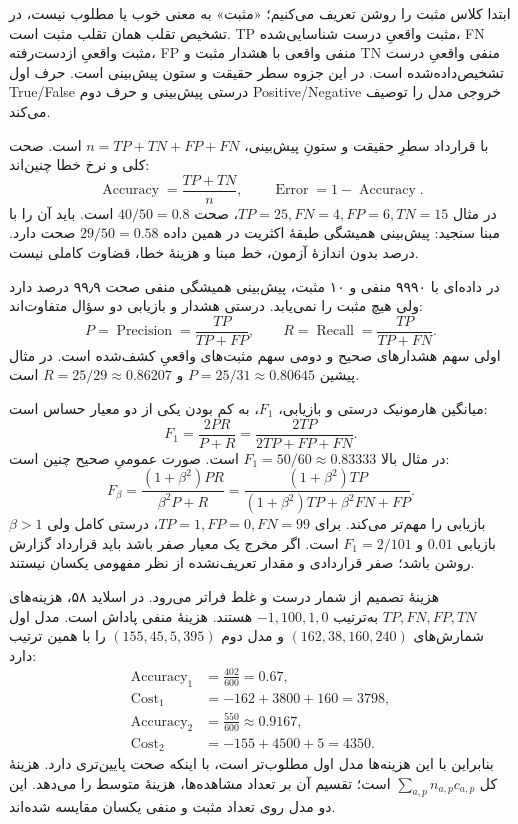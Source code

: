 \documentclass[12pt,a4paper,oneside]{report}
\begin{document}
ابتدا کلاس مثبت را روشن تعریف می‌کنیم؛ «مثبت» به معنی خوب یا مطلوب نیست، در تشخیص تقلب همان تقلب مثبت است. TP مثبت واقعیِ درست شناسایی‌شده، FN مثبت واقعیِ ازدست‌رفته، FP منفی واقعی با هشدار مثبت و TN منفی واقعیِ درست تشخیص‌داده‌شده است. در این جزوه سطر حقیقت و ستون پیش‌بینی است. حرف اول True/False درستی پیش‌بینی و حرف دوم Positive/Negative خروجی مدل را توصیف می‌کند.

با قرارداد سطرِ حقیقت و ستونِ پیش‌بینی، $n=TP+TN+FP+FN$ است. صحت کلی و نرخ خطا چنین‌اند:
\[\operatorname{Accuracy}=\frac{TP+TN}{n},\qquad \operatorname{Error}=1-\operatorname{Accuracy}.\]
در مثال $TP=25,FN=4,FP=6,TN=15$، صحت $40/50=0.8$ است. باید آن را با مبنا سنجید: پیش‌بینی همیشگی طبقهٔ اکثریت در همین داده $29/50=0.58$ صحت دارد. درصد بدون اندازهٔ آزمون، خط مبنا و هزینهٔ خطا، قضاوت کاملی نیست.

در داده‌ای با ۹۹۹۰ منفی و ۱۰ مثبت، پیش‌بینی همیشگی منفی صحت ۹۹٫۹ درصد دارد ولی هیچ مثبت را نمی‌یابد. درستی هشدار و بازیابی دو سؤال متفاوت‌اند:
\[P=\operatorname{Precision}=\frac{TP}{TP+FP},\qquad R=\operatorname{Recall}=\frac{TP}{TP+FN}.\]
اولی سهم هشدارهای صحیح و دومی سهم مثبت‌های واقعیِ کشف‌شده است. در مثال پیشین $P=25/31\approx0.80645$ و $R=25/29\approx0.86207$ است.

میانگین هارمونیک درستی و بازیابی، $F_1$، به کم بودن یکی از دو معیار حساس است:
\[F_1=\frac{2PR}{P+R}=\frac{2TP}{2TP+FP+FN}.\]
در مثال بالا $F_1=50/60\approx0.83333$ است. صورت عمومیِ صحیح چنین است:
\[F_\beta=\frac{(1+\beta^2)PR}{\beta^2P+R}=\frac{(1+\beta^2)TP}{(1+\beta^2)TP+\beta^2FN+FP}.\]
$\beta>1$ بازیابی را مهم‌تر می‌کند. برای $TP=1,FP=0,FN=99$، درستی کامل ولی بازیابی $0.01$ و $F_1=2/101$ است. اگر مخرج یک معیار صفر باشد باید قرارداد گزارش روشن باشد؛ صفر قراردادی و مقدار تعریف‌نشده از نظر مفهومی یکسان نیستند.

هزینهٔ تصمیم از شمار درست و غلط فراتر می‌رود. در اسلاید ۵۸، هزینه‌های $TP,FN,FP,TN$ به‌ترتیب $-1,100,1,0$ هستند. هزینهٔ منفی پاداش است. مدل اول شمارش‌های $(162,38,160,240)$ و مدل دوم $(155,45,5,395)$ را با همین ترتیب دارد:
\begin{align*}
\operatorname{Accuracy}_1&=\frac{402}{600}=0.67,\\
\operatorname{Cost}_1&=-162+3800+160=3798,\\
\operatorname{Accuracy}_2&=\frac{550}{600}\approx0.9167,\\
\operatorname{Cost}_2&=-155+4500+5=4350.
\end{align*}
بنابراین با این هزینه‌ها مدل اول مطلوب‌تر است، با اینکه صحت پایین‌تری دارد. هزینهٔ کل $\sum_{a,p}n_{a,p}c_{a,p}$ است؛ تقسیم آن بر تعداد مشاهده‌ها، هزینهٔ متوسط را می‌دهد. این دو مدل روی تعداد مثبت و منفی یکسان مقایسه شده‌اند.
\end{document}
